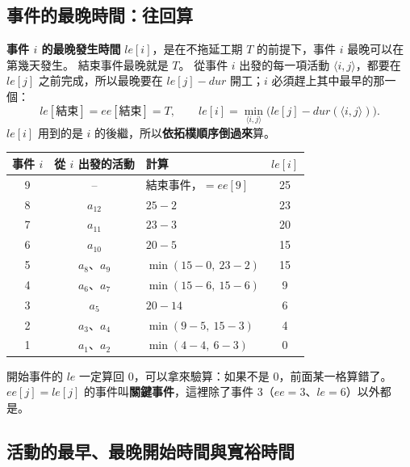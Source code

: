 \subsection{事件的最晚時間：往回算}

\textbf{事件 $i$ 的最晚發生時間} $\mathit{le}[i]$，是在不拖延工期 $T$ 的前提下，事件
$i$ 最晚可以在第幾天發生。 結束事件最晚就是 $T$。 從事件 $i$ 出發的每一項活動
$\langle i, j \rangle$，都要在 $\mathit{le}[j]$ 之前完成，所以最晚要在
$\mathit{le}[j] - \mathit{dur}$ 開工；$i$ 必須趕上其中最早的那一個：
\[
\mathit{le}[\text{結束}] = \mathit{ee}[\text{結束}] = T, \qquad
\mathit{le}[i] = \min_{\langle i, j \rangle} \bigl( \mathit{le}[j] - \mathit{dur}(\langle i, j \rangle) \bigr).
\]
$\mathit{le}[i]$ 用到的是 $i$ 的後繼，所以\textbf{依拓樸順序倒過來}算。

\begin{center}
\small
\begin{tabular}{cclc}
\toprule
事件 $i$ & 從 $i$ 出發的活動 & 計算 & $\mathit{le}[i]$ \\
\midrule
9 & -- & 結束事件，$= \mathit{ee}[9]$ & 25 \\
8 & $a_{12}$ & $25 - 2$ & 23 \\
7 & $a_{11}$ & $23 - 3$ & 20 \\
6 & $a_{10}$ & $20 - 5$ & 15 \\
5 & $a_8$、$a_9$ & $\min(15 - 0,\ 23 - 2)$ & 15 \\
4 & $a_6$、$a_7$ & $\min(15 - 6,\ 15 - 6)$ & 9 \\
3 & $a_5$ & $20 - 14$ & 6 \\
2 & $a_3$、$a_4$ & $\min(9 - 5,\ 15 - 3)$ & 4 \\
1 & $a_1$、$a_2$ & $\min(4 - 4,\ 6 - 3)$ & 0 \\
\bottomrule
\end{tabular}
\end{center}

開始事件的 $\mathit{le}$ 一定算回 $0$，可以拿來驗算：如果不是 $0$，前面某一格算錯了。
$\mathit{ee}[j] = \mathit{le}[j]$ 的事件叫\textbf{關鍵事件}，這裡除了事件 3（$\mathit{ee}
= 3$、$\mathit{le} = 6$）以外都是。

\subsection{活動的最早、最晚開始時間與寬裕時間}


